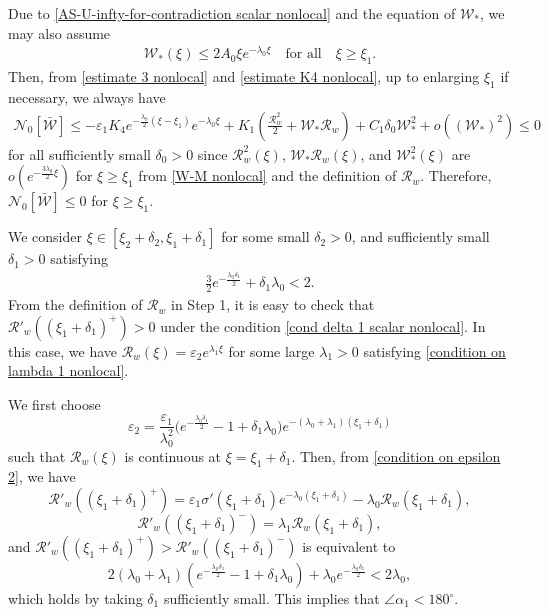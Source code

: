 \documentclass[11pt,a4paper]{article}
\numberwithin{equation}{section}
\numberwithin{figure}{section}
\newcommand\bea{\begin{eqnarray}}
\newcommand\eea{\end{eqnarray}}
\newcommand\beaa{\begin{eqnarray*}}
\newcommand\eeaa{\end{eqnarray*}}
\begin{document}
Due to \eqref{AS-U-infty-for-contradiction scalar nonlocal} and the equation of $\mathcal{W}_*$, we may also assume
\bea\label{W-M nonlocal}
\mathcal{W}_*(\xi) \leq 2A_0\xi e^{-\lambda_0\xi}\quad \mbox{for all}\quad\xi\geq \xi_1.
\eea
Then, from \eqref{estimate 3 nonlocal} and \eqref{estimate K4 nonlocal}, up to enlarging $\xi_1$ if necessary, we always have %
\beaa
\mathcal{N}_0[\bar{\mathcal{W}}]\le -\varepsilon_1K_4e^{-\frac{\lambda_0}{2}(\xi-\xi_1)}e^{-\lambda_0\xi}+K_1(\frac{\mathcal{R}_w^2}{2}+\mathcal{W}_*\mathcal{R}_w)+C_1\delta_0\mathcal{W}_*^2+o((\mathcal{W}_*)^2)\le 0
\eeaa
for all sufficiently small $\delta_0>0$
since $\mathcal{R}_w^2(\xi)$, $\mathcal{W}_*\mathcal{R}_w(\xi)$, and  $\mathcal{W}_*^2(\xi)$ are $o(e^{-\frac{3\lambda_0}{2}\xi})$ for $\xi\ge \xi_1$ from \eqref{W-M nonlocal} and the definition of $\mathcal{R}_w$.
Therefore, $\mathcal{N}_0[\bar{\mathcal{W}}]\leq 0$ for $\xi\ge \xi_1$.


\medskip


 We consider $\xi\in[\xi_2+\delta_2,\xi_1+\delta_1]$ for some small $\delta_2>0$, and sufficiently small $\delta_1>0$ satisfying
\bea\label{cond delta 1 scalar nonlocal}
\frac{3}{2}e^{-\frac{\lambda_0\delta_1}{2}}+\delta_1\lambda_0<2.
\eea
From the definition of $\mathcal{R}_w$ in Step 1, it is easy to check that $\mathcal{R}'_w((\xi_1+\delta_1)^+)>0$ under the condition \eqref{cond delta 1 scalar nonlocal}.
In this case, we have $\mathcal{R}_w(\xi)=\varepsilon_2 e^{\lambda_1\xi}$
for some large $\lambda_1>0$ satisfying \eqref{condition on lambda 1 nonlocal}.

We first choose
\begin{equation}\label{condition on epsilon 2}
\varepsilon_2=\frac{\varepsilon_1}{\lambda^2_0}\Big(e^{-\frac{\lambda_0\delta_1}{2}}-1+\delta_1\lambda_0\Big)e^{-(\lambda_0+\lambda_1)(\xi_1+\delta_1)}
\end{equation}
such that $\mathcal{R}_w(\xi)$ is continuous at $\xi=\xi_{1}+\delta_1$. Then, from \eqref{condition on epsilon 2}, we have
$$\mathcal{R}'_w((\xi_1+\delta_1)^{+})=\varepsilon_1\sigma'(\xi_1+\delta_1)e^{-\lambda_0(\xi_1+\delta_1)}- \lambda_0\mathcal{R}_w(\xi_1+\delta_1),$$
$$\mathcal{R}'_w((\xi_1+\delta_1)^{-})=\lambda_1\mathcal{R}_w(\xi_1+\delta_1),$$
and $\mathcal{R}'_w((\xi_1+\delta_1)^{+})>\mathcal{R}'_w((\xi_1+\delta_1)^{-})$ is equivalent to
$$2(\lambda_0+\lambda_1)(e^{-\frac{\lambda_0\delta_1}{2}}-1+\delta_1\lambda_0)+\lambda_0e^{-\frac{\lambda_0\delta_1}{2}}<2\lambda_0,$$
which holds by taking $\delta_1$ sufficiently small.
This implies that $\angle\alpha_1<180^{\circ}$.
\end{document}
